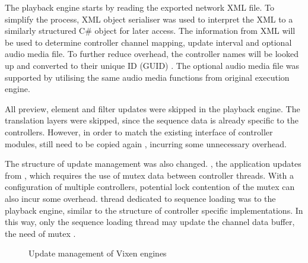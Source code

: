 The playback engine starts by reading the exported network XML file. To simplify the process,  XML object serialiser was used to interpret  the XML  to a similarly structured C\# object for later access. The information  from XML will be used to determine controller channel mapping, update interval and optional audio media file. To further reduce  overhead, the controller names will be looked up and converted to their unique ID (GUID) . The optional audio media file was supported by utilising the same audio media functions from original execution engine.

All preview, element and filter updates were skipped in the playback engine. The translation layers were skipped, since the sequence data is already specific to the controllers. However, in order to match the existing interface of controller modules,  still need to be copied again , incurring some unnecessary overhead.

The structure of update management was also changed. , the application updates  from , which requires the use of mutex  data  between controller threads. With a configuration  of multiple controllers, potential lock contention of the mutex can also incur some overhead.  thread dedicated to sequence loading was  to the playback engine, similar to the structure of controller specific implementations. In this way, only the sequence loading thread may update the channel data buffer,  the need of mutex .

\begin{figure}[t]
  \centering
  \hfil
  \caption{\footnotesize Update management of Vixen engines}
  \label{fig:update}
\end{figure}

